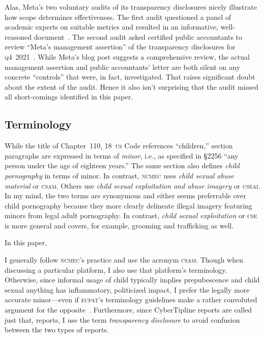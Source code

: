 \documentclass[nonacm,screen]{acmart}
\newcommand\V[1]{\textsc{\MakeLowercase{#1}}}
\begin{document}
Alas, Meta's two voluntary audits of its transparency disclosures nicely
illustrate how scope determines effectiveness. The first audit questioned a
panel of academic experts on suitable metrics and resulted in an informative,
well-reasoned document~\cite{BradfordGriselea2019,Plumb2019}. The second audit
asked certified public accountants to review ``Meta's management assertion'' of
the transparency disclosures for \V{Q4}~2021~\cite{Meta2022,Sarang2022}. While
Meta's blog post suggests a comprehensive review, the actual management
assertion and public accountants' letter are both silent on any concrete
``controls'' that were, in fact, investigated. That raises significant doubt
about the extent of the audit. Hence it also isn't surprising that the audit
missed all short-comings identified in this paper.


\subsection{Terminology}

While the title of Chapter~110, 18~\V{US} Code references ``children,'' section
paragraphs are expressed in terms of \emph{minor}, i.e., as specified in \S2256
``any person under the age of eighteen years.'' The same section also defines
\emph{child pornography} in terms of minor. In contrast, \V{NCMEC} uses
\emph{child sexual abuse material} or \V{CSAM}. Others use \emph{child sexual
exploitation and abuse imagery} or \V{CSEAI}. In my mind, the two terms are
synonymous and either seems preferrable over child pornography because they more
clearly delineate illegal imagery featuring minors from legal adult pornography.
In contrast, \emph{child sexual exploitation} or \V{CSE} is more general and
covers, for example, grooming and trafficking as well.

In this paper,


I generally follow \V{NCMEC}'s practice and use the acronym
\V{CSAM}. Though when discussing a particular platform, I also use that
platform's terminology. Otherwise, since informal usage of child typically
implies prepubescence and child sexual anything has inflammatory, politicized
impact, I prefer the legally more accurate minor---even if \V{ECPAT}'s
terminology guidelines make a rather convoluted argument for the
opposite~\cite{GreijerDoek2016}. Furthermore, since CyberTipline reports are
called just that, reports, I use the term \emph{transparency disclosure} to
avoid confusion between the two types of reports.
\end{document}
